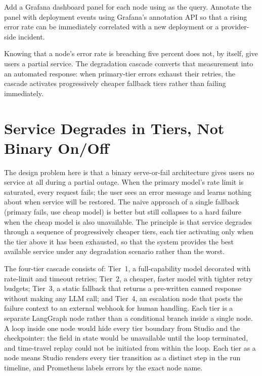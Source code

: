 \begin{tipbox}
  Add a Grafana dashboard panel for each node using
  as the query. Annotate the panel with deployment events using Grafana's
  annotation API so that a rising error rate can be immediately correlated
  with a new deployment or a provider-side incident.
\end{tipbox}

Knowing that a node's error rate is breaching five percent does not, by
itself, give users a partial service. The degradation cascade converts that
measurement into an automated response: when primary-tier errors exhaust
their retries, the cascade activates progressively cheaper fallback tiers
rather than failing immediately.

\section{Service Degrades in Tiers, Not Binary On/Off}
\label{sec:degradation-cascade}

The design problem here is that a binary serve-or-fail architecture gives
users no service at all during a partial outage. When the primary model's
rate limit is saturated, every request fails; the user sees an error message
and learns nothing about when service will be restored. The naive approach
of a single fallback (primary fails, use cheap model) is better but still
collapses to a hard failure when the cheap model is also unavailable. The
principle is that service degrades through a sequence of progressively
cheaper tiers, each tier activating only when the tier above it has been
exhausted, so that the system provides the best available service under
any degradation scenario rather than the worst.

The four-tier cascade consists of: Tier~1, a full-capability model
decorated with rate-limit and timeout retries; Tier~2, a cheaper, faster
model with tighter retry budgets; Tier~3, a static fallback that returns
a pre-written canned response without making any LLM call; and Tier~4,
an escalation node that posts the failure context to an external webhook
for human handling. Each tier is a separate LangGraph node rather than a
conditional branch inside a single node. A loop inside one node would hide
every tier boundary from Studio and the checkpointer: the 
field in state would be unavailable until the loop terminated, and
time-travel replay could not be initiated from within the loop. Each tier
as a node means Studio renders every tier transition as a distinct step in
the run timeline, and Prometheus labels errors by the exact node name.

